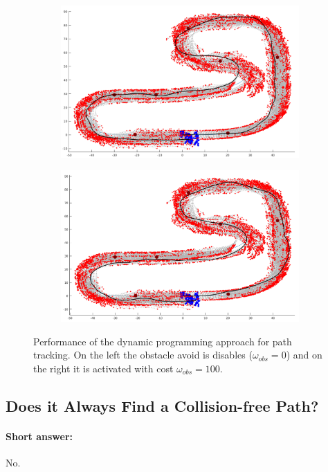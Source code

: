 \begin{figure}[h]
\begin{subfigure}{.49\textwidth}
		\includegraphics[width=\textwidth]{figures/dyn_prog_no_obs_avoid_2.png}
	\end{subfigure}
	\begin{subfigure}{.49\textwidth}
		\includegraphics[width=\textwidth]{figures/dyn_prog_obs_avoid_2.png}
	\end{subfigure}
	\caption{Performance of the dynamic programming approach for path tracking. On the left the obstacle avoid is disables ($\omega_{obs} = 0$) and on the right it is activated with cost $\omega_{obs} = 100$.}
	\label{fig:dyn_prog_results}
\end{figure}

\subsection{Does it Always Find a Collision-free Path?}
\paragraph{Short answer:} No.

